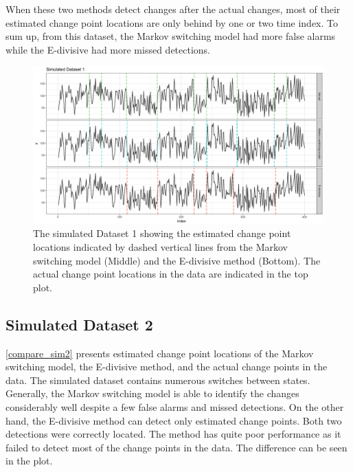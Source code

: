 When these two methods detect changes after the actual changes, most
of their estimated change point locations are only behind by one or
two time index. To sum up, from this dataset, the Markov switching
model had more false alarms while the E-divisive had more missed detections. 

\begin{figure}[h]
\begin{centering}
\includegraphics[scale=0.35]{picture/compare_sim1}
\par\end{centering}
\caption{The simulated Dataset 1 showing the estimated change point locations
indicated by dashed vertical lines from the Markov switching model
(Middle) and the E-divisive method (Bottom). The actual change point
locations in the data are indicated in the top plot. }

\label{compare_sim1}
\end{figure}


\subsection{Simulated Dataset 2}

\ref{compare_sim2} presents estimated change point locations of the
Markov switching model, the E-divisive method, and the actual change
points in the data. The simulated dataset contains numerous switches
between states. Generally, the Markov switching model is able to identify
the changes considerably well despite a few false alarms and missed
detections. On the other hand, the E-divisive method can detect only
estimated change points. Both two detections were correctly located.
The method has quite poor performance as it failed to detect most
of the change points in the data. The difference can be seen in the
plot.

